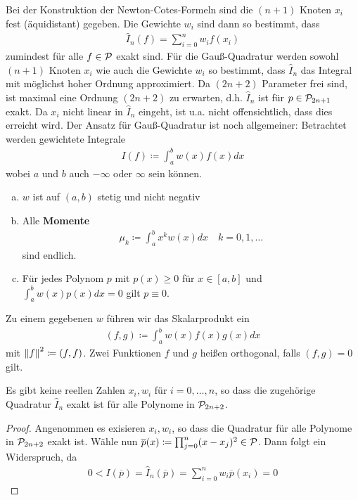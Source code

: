 Bei der Konstruktion der Newton-Cotes-Formeln sind die
$(n+1)$ Knoten $x_i$ fest (äquidistant) gegeben.
Die Gewichte $w_i$ sind dann so bestimmt, dass
\begin{gather*}
  \hat{I}_n(f) =\sum_{i=0}^n w_if(x_i)
\end{gather*}
zumindest für alle $f\in\mathcal{P}$ exakt sind.
Für die Gauß-Quadratur werden sowohl $(n+1)$ Knoten $x_i$
wie auch die Gewichte $w_i$ so bestimmt, dass
$\hat{I}_n$ das Integral
mit möglichst hoher Ordnung approximiert.
Da $(2n+2)$ Parameter frei sind,
ist maximal eine Ordnung $(2n+2)$ zu erwarten,
d.h. $\hat{I}_n$ ist für $p\in\mathcal{P}_{2n+1}$ exakt.
Da $x_i$ nicht linear in $\hat{I}_n$ eingeht,
ist u.a. nicht offensichtlich,
dass dies erreicht wird.
Der Ansatz für Gauß-Quadratur ist noch allgemeiner:
Betrachtet werden gewichtete Integrale
\begin{gather}
  I(f) \coloneqq \int_a^bw(x)f(x)dx
  \label{VII.4.1}
\end{gather}
wobei $a$ und $b$ auch $-\infty$ oder $\infty$ sein können.

\begin{enumerate}[a)]
\item $w$ ist auf $(a,b)$ stetig und nicht negativ 
\item Alle \textbf{Momente}
  \begin{gather*}
    \mu_k\coloneqq \int_a^b x^kw(x)dx\quad k=0,1,\ldots
  \end{gather*}
  sind endlich.
\item Für jedes Polynom $p$ mit $p(x) \geq 0$
  für $x\in[a,b]$ und $\int_a^bw(x)p(x)dx=0$
  gilt $p\equiv 0$.
\end{enumerate}
Zu einem gegebenen $w$ führen wir das
Skalarprodukt ein
\begin{gather}
  (f,g)\coloneqq \int_a^bw(x)f(x)g(x)dx 
  \label{VII.4.2}
\end{gather}
mit $\left\| f \right\|^2\coloneqq (f,f)$.
Zwei Funktionen $f$ und $g$ heißen orthogonal,
falls $(f,g)=0$ gilt.

\begin{Leme}
  \label{7.4.2}
  Es gibt keine reellen Zahlen $x_i, w_i$ für $i=0,\ldots,n$,
  so dass die zugehörige Quadratur $\hat{I}_n$ exakt ist
  für alle Polynome in $\mathcal{P}_{2n+2}$.

  \begin{proof}
    Angenommen es exisieren $x_i,w_i$, so dass die Quadratur
    für alle Polynome in $\mathcal{P}_{2n+2}$ exakt ist.
    Wähle nun $\overline{p}(x)\coloneqq
    \prod_{j=0}^n(x-x_j)^2\in\mathcal{P}$.
    Dann folgt ein Widerspruch, da
    \begin{gather*}
      0<I(\overline{p})=\hat{I}_n(\overline{p})
      =\sum_{i=0}^nw_i\overline{p}(x_i) = 0
    \end{gather*}
  \end{proof}
\end{Leme}


